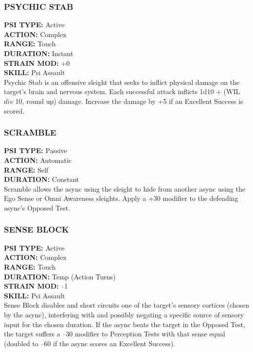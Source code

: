 \subsubsection{PSYCHIC STAB}
\textbf{PSI TYPE:} Active \\ 
\textbf{ACTION:} Complex \\ 
\textbf{RANGE:} Touch \\ 
\textbf{DURATION:} Instant \\
\textbf{STRAIN MOD:} +0 \\ 
\textbf{SKILL:} Psi Assault \\
Psychic Stab is an offensive sleight that seeks to inflict
physical damage on the target’s brain and nervous
system. Each successful attack inflicts 1d10 + (WIL $div$
10, round up) damage. Increase the damage by +5 if
an Excellent Success is scored.

\subsubsection{SCRAMBLE}
\textbf{PSI TYPE:} Passive \\ 
\textbf{ACTION:} Automatic \\ 
\textbf{RANGE:} Self \\ 
\textbf{DURATION:} Constant \\
Scramble allows the async using the sleight to hide
from another async using the Ego Sense or Omni
Awareness sleights. Apply a +30 modifier to the defending
async’s Opposed Test.

\subsubsection{SENSE BLOCK}
\textbf{PSI TYPE:} Active \\ 
\textbf{ACTION:} Complex \\ 
\textbf{RANGE:} Touch \\ 
\textbf{DURATION:} Temp (Action Turns) \\
\textbf{STRAIN MOD:} –1 \\ 
\textbf{SKILL:} Psi Assault \\
Sense Block disables and short circuits one of the target’s
sensory cortices (chosen by the async), interfering
with and possibly negating a specific source of sensory
input for the chosen duration. If the async beats the
target in the Opposed Test, the target suffers a –30
modifier to Perception Tests with that sense equal (doubled
to –60 if the async scores an Excellent Success).


